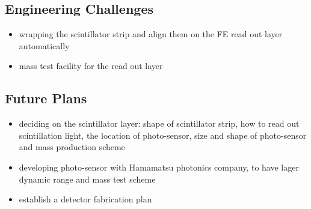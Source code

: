\subsection{Engineering Challenges}
\begin{itemize}
	\item wrapping the scintillator strip and align them on the FE read out layer automatically
	\item mass test facility for the read out layer
\end{itemize}

\subsection{Future Plans}
\begin{itemize}
	\item deciding on the scintillator layer: shape of scintillator strip, how to read out scintillation light, the location of  photo-sensor, size and shape of photo-sensor and mass production scheme
	\item developing photo-sensor with Hamamatsu photonics company, to have lager dynamic range and mass test scheme
	\item establish a detector fabrication plan
\end{itemize}
